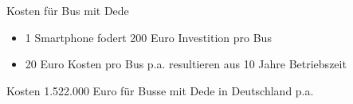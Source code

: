 
\begin{frame}{Kosten für Bus mit Dede}
  \begin{itemize}
  \item 1 Smartphone fodert 200 Euro Investition pro Bus
  \item 20 Euro Kosten pro Bus p.a. resultieren aus 10 Jahre Betriebszeit
  \end{itemize}
  \begin{block}{Kosten}
    1.522.000 Euro für Busse mit Dede in Deutschland p.a.
  \end{block}
\end{frame}
